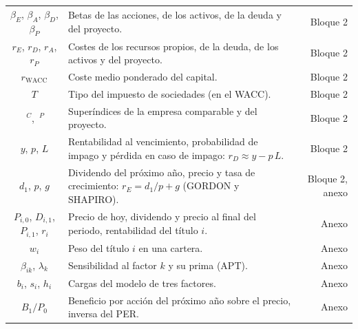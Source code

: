 \documentclass[10pt,a4paper]{article}
\begin{document}
\begin{longtable}{SMD}
$\beta_E$, $\beta_A$, $\beta_D$, $\beta_P$ & Betas de las acciones, de los activos, de la deuda y del proyecto. & Bloque 2\\
$r_E$, $r_D$, $r_A$, $r_P$ & Costes de los recursos propios, de la deuda, de los activos y del proyecto. & Bloque 2\\
$r_{\text{WACC}}$ & Coste medio ponderado del capital. & Bloque 2\\
$T$ & Tipo del impuesto de sociedades (en el WACC). & Bloque 2\\
$\,^C$, $\,^P$ & Superíndices de la empresa comparable y del proyecto. & Bloque 2\\
$y$, $p$, $L$ & Rentabilidad al vencimiento, probabilidad de impago y pérdida en caso de impago: $r_D\approx y-p\,L$. & Bloque 2\\
$d_1$, $p$, $g$ & Dividendo del próximo año, precio y tasa de crecimiento: $r_E=d_1/p+g$ (GORDON y SHAPIRO). & Bloque 2, anexo\\
$P_{i,0}$, $D_{i,1}$, $P_{i,1}$, $r_i$ & Precio de hoy, dividendo y precio al final del periodo, rentabilidad del título $i$. & Anexo\\
$w_i$ & Peso del título $i$ en una cartera. & Anexo\\
$\beta_{ik}$, $\lambda_k$ & Sensibilidad al factor $k$ y su prima (APT). & Anexo\\
$b_i$, $s_i$, $h_i$ & Cargas del modelo de tres factores. & Anexo\\
$B_1/P_0$ & Beneficio por acción del próximo año sobre el precio, inversa del PER. & Anexo\\
\end{longtable}
\end{document}
